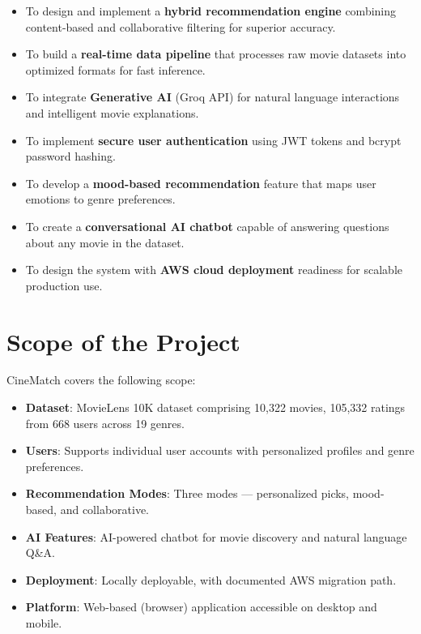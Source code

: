 \documentclass[12pt,a4paper]{report}
\begin{document}
\begin{itemize}
    \item To design and implement a \textbf{hybrid recommendation engine} combining content-based and collaborative filtering for superior accuracy.
    \item To build a \textbf{real-time data pipeline} that processes raw movie datasets into optimized formats for fast inference.
    \item To integrate \textbf{Generative AI} (Groq API) for natural language interactions and intelligent movie explanations.
    \item To implement \textbf{secure user authentication} using JWT tokens and bcrypt password hashing.
    \item To develop a \textbf{mood-based recommendation} feature that maps user emotions to genre preferences.
    \item To create a \textbf{conversational AI chatbot} capable of answering questions about any movie in the dataset.
    \item To design the system with \textbf{AWS cloud deployment} readiness for scalable production use.
\end{itemize}

\section{Scope of the Project}

CineMatch covers the following scope:

\begin{itemize}
    \item \textbf{Dataset}: MovieLens 10K dataset comprising 10,322 movies, 105,332 ratings from 668 users across 19 genres.
    \item \textbf{Users}: Supports individual user accounts with personalized profiles and genre preferences.
    \item \textbf{Recommendation Modes}: Three modes --- personalized picks, mood-based, and collaborative.
    \item \textbf{AI Features}: AI-powered chatbot for movie discovery and natural language Q\&A.
    \item \textbf{Deployment}: Locally deployable, with documented AWS migration path.
    \item \textbf{Platform}: Web-based (browser) application accessible on desktop and mobile.
\end{itemize}
\end{document}
